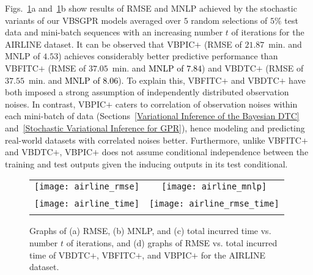 \documentclass[conference]{IEEEtran}
\begin{document}
	Figs.~\ref{fig4}a and~\ref{fig4}b show results of RMSE and MNLP achieved by the stochastic variants of our VBSGPR models averaged over $5$ random selections of $5\%$ test data and mini-batch sequences with an increasing number $t$ of iterations for the AIRLINE dataset.
It can be observed that VBPIC$+$ (RMSE of $21.87$~min. and MNLP of $4.53$) achieves considerably better predictive performance than VBFITC$+$ (RMSE of $37.05$~min. and \textcolor{black}{MNLP of $7.84$}) and VBDTC$+$ (RMSE of $37.55$~min. and \textcolor{black}{MNLP of $8.06$}). 
		To explain this, VBFITC$+$ and VBDTC$+$ have both imposed a strong assumption of independently distributed observation noises. 
		In contrast, VBPIC$+$ caters to correlation of observation noises within each mini-batch of data (Sections~\ref{Variational Inference of the Bayesian DTC} and~\ref{Stochastic Variational Inference for GPR}), hence modeling and predicting real-world datasets with correlated noises better.
		Furthermore, unlike VBFITC$+$ and VBDTC$+$, VBPIC$+$ does not assume conditional independence between the training and test outputs given the inducing outputs in its test conditional.
	\begin{figure}
		\begin{tabular}{cc}
			\hspace{-2mm}\texttt{[image: airline\_rmse]} &
			\hspace{-4mm}\texttt{[image: airline\_mnlp]} 
			\vspace{-1mm}\\
			\hspace{-2mm}{(a)} & \hspace{-4mm}{(b)}
			\\
			\hspace{-2mm}\texttt{[image: airline\_time]} &
			\hspace{-4mm}\texttt{[image: airline\_rmse\_time]}
			\vspace{-1mm}\\
			\hspace{-2mm}{(c)} & \hspace{-4mm}{(d)}\vspace{-0.7mm}
		\end{tabular}
		\caption{Graphs of (a) RMSE, (b) MNLP, and (c) total incurred time vs. number $t$ of iterations, and (d) graphs of RMSE vs. total incurred time of VBDTC$+$, VBFITC$+$, and VBPIC$+$ for the AIRLINE dataset.}
		\label{fig4}
	\end{figure}
\end{document}
